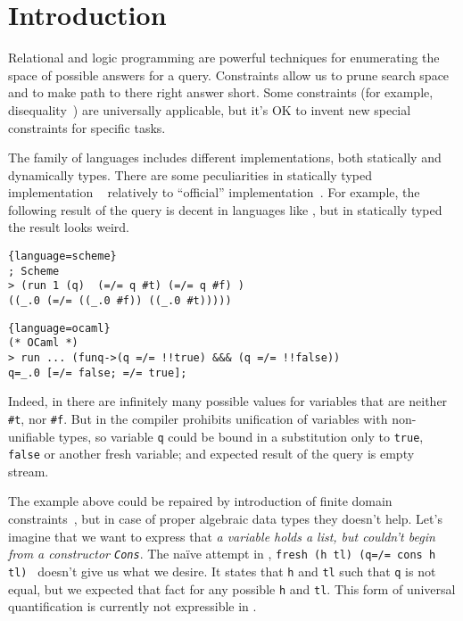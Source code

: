 \section{Introduction}
\label{sec:intro}

Relational and logic programming are powerful techniques for enumerating the space of possible answers for a query. Constraints allow us to prune search space and to make path to there right answer short. Some constraints (for example, disequality~\cite{WillThesis}) are universally applicable, but it's OK to invent new special constraints for specific tasks. 

The \miniKanren{} family of languages includes different implementations, both statically and dynamically types. There are some peculiarities in statically typed implementation \OCanren{}~\cite{ocanren} relatively to ``official'' implementation~\cite{fasterMK}. For example, the following result of the query is decent in languages like 
\Scheme{}, but in statically typed \OCaml{} the result looks weird.

\begin{minipage}{7cm}
\begin{lstlisting}{language=scheme}
; Scheme
> (run 1 (q)  (=/= q #t) (=/= q #f) )
((_.0 (=/= ((_.0 #f)) ((_.0 #t)))))
\end{lstlisting}
\end{minipage}
\begin{minipage}{9.5cm}
\begin{lstlisting}{language=ocaml}
(* OCaml *)
> run ... (funq->(q =/= !!true) &&& (q =/= !!false))
q=_.0 [=/= false; =/= true];
\end{lstlisting}
\end{minipage}

\noindent Indeed, in \Scheme{} there are infinitely many possible values for variables that are neither \lstinline[]=#t=, nor 
\lstinline[]=#f=. But in \OCanren{} the compiler prohibits unification of variables with non-unifiable types, so variable \verb=q= could be bound in a substitution only to \lstinline=true=, \lstinline=false= or another fresh variable; and expected result of the query is empty stream.

The example above could be repaired by introduction of finite domain constraints~\cite{cKanren}, but in case of proper algebraic data types they doesn't help. Let's imagine that we want to express that \emph{a variable holds a list, but couldn't begin from a constructor \lstinline=Cons=}. The na\"{i}ve attempt in \OCanren{}, \lstinline|fresh (h tl) (q=/= cons h tl) | doesn't give us what we desire. It states that  \lstinline|h| and \lstinline|tl| such that \lstinline|q| is not equal, but we expected that fact for any possible \lstinline|h| and \lstinline|tl|. This form of universal quantification is currently not expressible in \OCanren{}.

